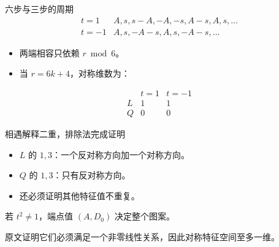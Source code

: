 \documentclass{beamer}
\begin{document}
\begin{frame}{六步与三步的周期}
\[
\begin{array}{c|l}
t=1&A,s,s-A,-A,-s,A-s,A,s,\ldots\\
t=-1&A,s,-A-s,A,s,-A-s,\ldots
\end{array}
\]
\begin{itemize}
\item 两端相容只依赖 $r\bmod6$。
\item 当 $r=6k+4$，对称维数为：
\end{itemize}
\[
\begin{array}{c|cc}&t=1&t=-1\\\hline L&1&1\\Q&0&0\end{array}
\]
\end{frame}
\begin{frame}{相遇解释二重，排除法完成证明}
\begin{itemize}
\item $L$ 的 $1,3$：一个反对称方向加一个对称方向。
\item $Q$ 的 $1,3$：只有反对称方向。
\item 还必须证明其他特征值不重复。
\end{itemize}
若 $t^2\ne1$，端点值 $(A,D_0)$ 决定整个图案。

原文证明它们必须满足一个非零线性关系，因此对称特征空间至多一维。
\end{frame}
\end{document}
